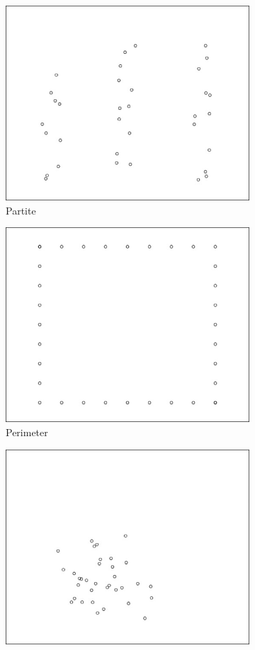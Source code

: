 \documentclass[runningheads]{llncs}
\begin{document}
\begin{figure}[H]
	\centering
	\begin{subfigure}{0.3\textwidth}
		\centering
		\includegraphics[width=.8\linewidth]{partite.png}\quad
		\caption{Partite}
		\label{fig:1}
	\end{subfigure}\hfil
	\begin{subfigure}{0.3\textwidth}
		\centering
		\includegraphics[width=.8\linewidth]{perimeter.png}\quad
		\caption{Perimeter}
		\label{fig:2}
	\end{subfigure}\hfil
	\begin{subfigure}{0.3\textwidth}
		\centering
		\includegraphics[width=.8\linewidth]{dense.png}

\end{subfigure}
\end{figure}
\end{document}
